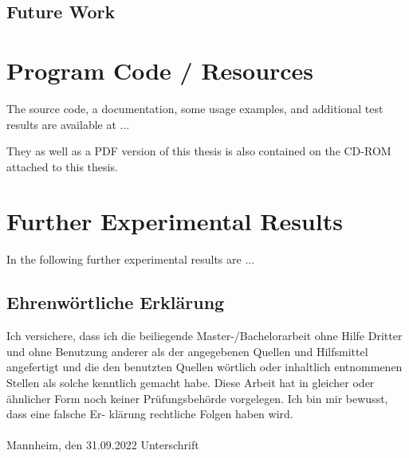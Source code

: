 \documentclass[11pt,titlepage,oneside,openany]{book}
\begin{document}
\section{Future Work}
\label{sec:future}






\appendix

\chapter{Program Code / Resources}
\label{cha:appendix-a}

The source code, a documentation, some usage examples, and additional test results are available at ...

They as well as a PDF version of this thesis is also contained on the CD-ROM attached to this thesis.

\chapter{Further Experimental Results}
\label{cha:appendix-b}

In the following further experimental results are ...


\newpage


\pagestyle{empty}


\section*{Ehrenw\"ortliche Erkl\"arung}
Ich versichere, dass ich die beiliegende Master-/Bachelorarbeit ohne Hilfe Dritter
und ohne Benutzung anderer als der angegebenen Quellen und Hilfsmittel
angefertigt und die den benutzten Quellen w\"ortlich oder inhaltlich
entnommenen Stellen als solche kenntlich gemacht habe. Diese Arbeit
hat in gleicher oder \"ahnlicher Form noch keiner Pr\"ufungsbeh\"orde
vorgelegen. Ich bin mir bewusst, dass eine falsche Er- kl\"arung rechtliche Folgen haben
wird.
\\
\\

\noindent
Mannheim, den 31.09.2022 \hspace{4cm} Unterschrift
\end{document}
